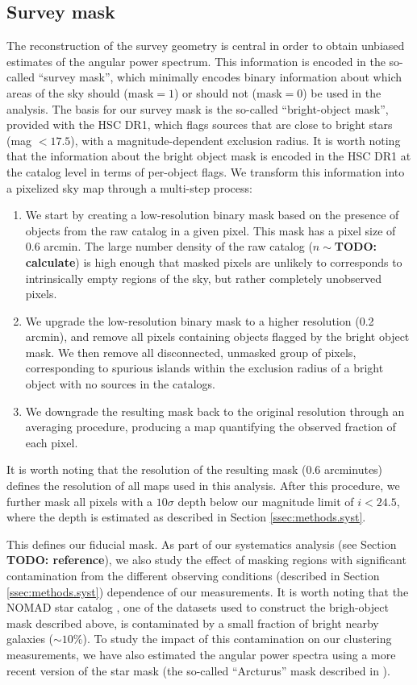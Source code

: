 \documentclass[a4paper,11pt]{article}
\newcommand{\todo}[1]{{\bf TODO: #1}}
\begin{document}
  \subsection{Survey mask}\label{ssec:methods.mask}
    The reconstruction of the survey geometry is central in order to obtain unbiased estimates of the angular power spectrum. This information is encoded in the so-called ``survey mask'', which minimally encodes binary information about which areas of the sky should (mask$=1$) or should not (mask$=0$) be used in the analysis. The basis for our survey mask is the so-called ``bright-object mask'', provided with the HSC DR1, which flags sources that are close to bright stars (mag $<17.5$), with a magnitude-dependent exclusion radius. It is worth noting that the information about the bright object mask is encoded in the HSC DR1 at the catalog level in terms of per-object flags. We transform this information into a pixelized sky map through a multi-step process:
    \begin{enumerate}
      \item We start by creating a low-resolution binary mask based on the presence of objects from the raw catalog in a given pixel. This mask has a pixel size of 0.6 arcmin. The large number density of the raw catalog  ($n\sim$\todo{calculate}) is high enough that masked pixels are unlikely to corresponds to intrinsically empty regions of the sky, but rather completely unobserved pixels.
      \item We upgrade the low-resolution binary mask to a higher resolution (0.2 arcmin), and remove all pixels containing objects flagged by the bright object mask. We then remove all disconnected, unmasked group of pixels, corresponding to spurious islands within the exclusion radius of a bright object with no sources in the catalogs.
      \item We downgrade the resulting mask back to the original resolution through an averaging procedure, producing a map quantifying the observed fraction of each pixel.
    \end{enumerate}
    It is worth noting that the resolution of the resulting mask ($0.6$ arcminutes) defines the resolution of all maps used in this analysis. After this procedure, we further mask all pixels with a $10\sigma$ depth below our magnitude limit of $i<24.5$, where the depth is estimated as described in Section \ref{ssec:methods.syst}.
    
    This defines our fiducial mask. As part of our systematics analysis (see Section \todo{reference}), we also study the effect of masking regions with significant contamination from the different observing conditions (described in Section \ref{ssec:methods.syst}) dependence of our measurements. It is worth noting that the NOMAD star catalog \cite{2004AAS...205.4815Z}, one of the datasets used to construct the brigh-object mask described above, is contaminated by a small fraction of bright nearby galaxies ($\sim10\%$). To study the impact of this contamination on our clustering measurements, we have also estimated the angular power spectra using a more recent version of the star mask (the so-called ``Arcturus'' mask described in \cite{2018PASJ...70S...7C}).
    
\end{document}
